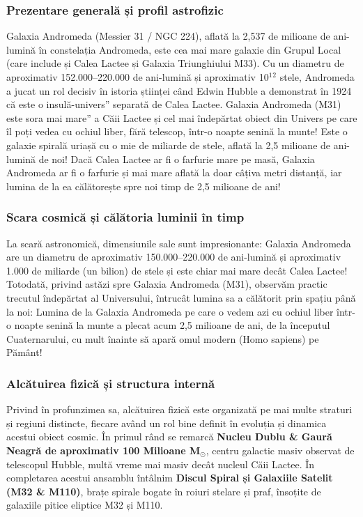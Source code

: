 \subsubsection*{Prezentare generală și profil astrofizic}
Galaxia Andromeda (Messier 31 / NGC 224), aflată la 2,537 de milioane de ani-lumină în constelația Andromeda, este cea mai mare galaxie din Grupul Local (care include și Calea Lactee și Galaxia Triunghiului M33). Cu un diametru de aproximativ 152.000--220.000 de ani-lumină și aproximativ 10$^1$$^2$ stele, Andromeda a jucat un rol decisiv în istoria științei când Edwin Hubble a demonstrat în 1924 că este o \quotedblbase{}insulă-univers\textquotedblright{} separată de Calea Lactee. Galaxia Andromeda (M31) este \quotedblbase{}sora mai mare\textquotedblright{} a Căii Lactee și cel mai îndepărtat obiect din Univers pe care îl poți vedea cu ochiul liber, fără telescop, într-o noapte senină la munte! Este o galaxie spirală uriașă cu o mie de miliarde de stele, aflată la 2,5 milioane de ani-lumină de noi! Dacă Calea Lactee ar fi o farfurie mare pe masă, Galaxia Andromeda ar fi o farfurie și mai mare aflată la doar câțiva metri distanță, iar lumina de la ea călătorește spre noi timp de 2,5 milioane de ani!

\subsubsection*{Scara cosmică și călătoria luminii în timp}
La scară astronomică, dimensiunile sale sunt impresionante: Galaxia Andromeda are un diametru de aproximativ 150.000--220.000 de ani-lumină și aproximativ 1.000 de miliarde (un bilion) de stele și este chiar mai mare decât Calea Lactee! Totodată, privind astăzi spre Galaxia Andromeda (M31), observăm practic trecutul îndepărtat al Universului, întrucât lumina sa a călătorit prin spațiu până la noi: Lumina de la Galaxia Andromeda pe care o vedem azi cu ochiul liber într-o noapte senină la munte a plecat acum 2,5 milioane de ani, de la începutul Cuaternarului, cu mult înainte să apară omul modern (Homo sapiens) pe Pământ!

\subsubsection*{Alcătuirea fizică și structura internă}
Privind în profunzimea sa, alcătuirea fizică este organizată pe mai multe straturi și regiuni distincte, fiecare având un rol bine definit în evoluția și dinamica acestui obiect cosmic. În primul rând se remarcă \textbf{Nucleu Dublu \& Gaură Neagră de aproximativ 100 Milioane M$_\odot$}, centru galactic masiv observat de telescopul Hubble, multă vreme mai masiv decât nucleul Căii Lactee. În completarea acestui ansamblu întâlnim \textbf{Discul Spiral și Galaxiile Satelit (M32 \& M110)}, brațe spirale bogate în roiuri stelare și praf, însoțite de galaxiile pitice eliptice M32 și M110.

